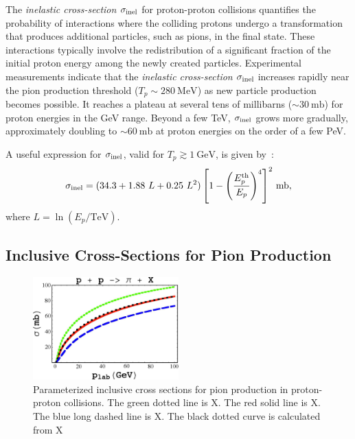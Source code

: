 The \emph{inelastic cross-section} \(\sigma_{\rm inel}\) for proton-proton collisions quantifies the probability of interactions where the colliding protons undergo a transformation that produces additional particles, such as pions, in the final state. These interactions typically involve the redistribution of a significant fraction of the initial proton energy among the newly created particles.
%
Experimental measurements indicate that the \emph{inelastic cross-section} \(\sigma_{\rm inel}\) increases rapidly near the pion production threshold (\(T_p \sim 280~\text{MeV}\)) as new particle production becomes possible. It reaches a plateau at several tens of millibarns (\(\sim 30~\text{mb}\)) for proton energies in the GeV range. Beyond a few TeV, \(\sigma_{\rm inel}\) grows more gradually, approximately doubling to \(\sim 60~\text{mb}\) at proton energies on the order of a few PeV.

A useful expression for \(\sigma_{\rm inel}\), valid for \(T_p \gtrsim 1~\text{GeV}\), is given by~\cite{Kelner2006prd}:
\begin{equation}
\sigma_{\rm inel} = (34.3 + 1.88~L + 0.25~L^2) \left[ 1 - \left( \frac{E^{\rm th}_p}{E_p} \right)^4 \right]^2 \, \text{mb},
\end{equation}
where \(L = \ln(E_p / \text{TeV})\). 

\subsection{Inclusive Cross-Sections for Pion Production }

\begin{figure}[t]
\centering
\includegraphics[width=0.5\textwidth]{figures/Norbury2009.jpg}
\caption{Parameterized inclusive cross sections for pion production in proton-proton collisions. The green dotted line is X. The red solid line is X. The blue long dashed line is X. The black dotted curve is calculated from X~\cite{Norbury2009nimpb}}
\label{fig:pionprod}
\end{figure}

